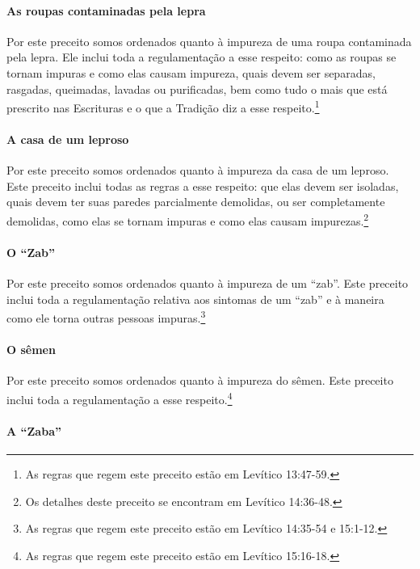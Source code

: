\paragraph{As roupas contaminadas pela lepra}

Por este preceito somos ordenados quanto à impureza de uma roupa
contaminada pela lepra. Ele inclui toda a regulamentação a esse
respeito: como as roupas se tornam impuras e como elas causam impureza,
quais devem ser separadas, rasgadas, queimadas, lavadas ou purificadas, bem
como tudo o mais que está prescrito nas Escrituras e o que a Tradição
diz a esse respeito.\footnote{As regras que regem este preceito estão em Levítico 13:47-59.}

\paragraph{A casa de um leproso}

Por este preceito somos ordenados quanto à impureza da casa de um
leproso. Este preceito inclui todas as regras a esse respeito: que elas
devem ser isoladas, quais devem ter suas paredes parcialmente demolidas,
ou ser completamente demolidas, como elas se tornam impuras e como elas
causam impurezas.\footnote{Os detalhes deste preceito se encontram em Levítico
14:36-48.}

\paragraph{O ``Zab''}

Por este preceito somos ordenados quanto à impureza de um ``zab''.
Este preceito inclui toda a regulamentação relativa aos sintomas de um
``zab'' e à maneira como ele torna outras pessoas
impuras.\footnote{As regras que regem este preceito estão em Levítico 14:35-54 e
  15:1-12.}

\paragraph{O sêmen}

Por este preceito somos ordenados quanto à impureza do sêmen. Este
preceito inclui toda a regulamentação a esse respeito.\footnote{As regras que regem este preceito estão em Levítico 15:16-18.}

\paragraph{A ``Zaba''}

